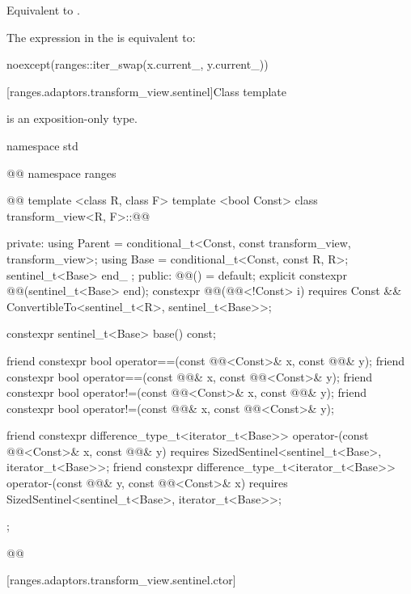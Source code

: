 \begin{itemdescr}
\pnum
\effects Equivalent to .

\pnum
\remarks The expression in the  is equivalent to:
\begin{codeblock}
noexcept(ranges::iter_swap(x.current_, y.current_))
\end{codeblock}
\end{itemdescr}


[ranges.adaptors.transform_view.sentinel]{Class template }

\pnum
{} is an exposition-only type.

\begin{codeblock}
namespace std { @@ namespace ranges { @@
  template <class R, class F>
  template <bool Const>
  class transform_view<R, F>::@@ {
  private:
    using Parent = conditional_t<Const, const transform_view, transform_view>;
    using Base = conditional_t<Const, const R, R>;
    sentinel_t<Base> end_ {};
  public:
    @@() = default;
    explicit constexpr @@(sentinel_t<Base> end);
    constexpr @@(@@<!Const> i)
      requires Const && ConvertibleTo<sentinel_t<R>, sentinel_t<Base>>;

    constexpr sentinel_t<Base> base() const;

    friend constexpr bool operator==(const @@<Const>& x, const @@& y);
    friend constexpr bool operator==(const @@& x, const @@<Const>& y);
    friend constexpr bool operator!=(const @@<Const>& x, const @@& y);
    friend constexpr bool operator!=(const @@& x, const @@<Const>& y);

    friend constexpr difference_type_t<iterator_t<Base>>
      operator-(const @@<Const>& x, const @@& y)
        requires SizedSentinel<sentinel_t<Base>, iterator_t<Base>>;
    friend constexpr difference_type_t<iterator_t<Base>>
      operator-(const @@& y, const @@<Const>& x)
        requires SizedSentinel<sentinel_t<Base>, iterator_t<Base>>;
  };
}}@\removed{\}\}}@
\end{codeblock}

[ranges.adaptors.transform_view.sentinel.ctor]{}

